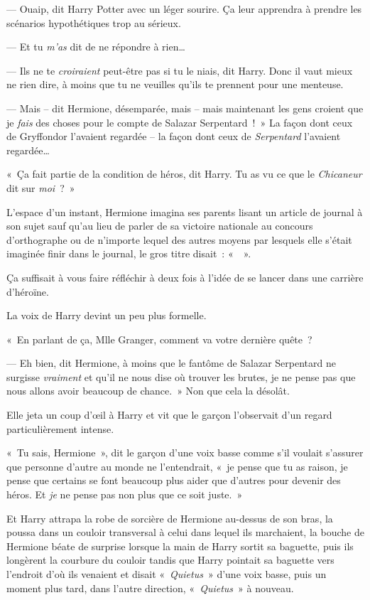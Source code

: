 --- Ouaip, dit Harry Potter avec un léger sourire.
Ça leur apprendra à prendre les scénarios hypothétiques trop au sérieux.

--- Et tu \emph{m'as} dit de ne répondre à rien…

--- Ils ne te \emph{croiraient} peut-être pas si tu le niais, dit Harry.
Donc il vaut mieux ne rien dire, à moins que tu ne veuilles qu'ils te prennent pour une menteuse.

--- Mais -- dit Hermione, désemparée, mais -- mais maintenant les gens croient que je \emph{fais} des choses pour le compte de Salazar Serpentard~!~»
La façon dont ceux de Gryffondor l'avaient regardée -- la façon dont ceux de \emph{Serpentard} l'avaient regardée…

«~Ça fait partie de la condition de héros, dit Harry.
Tu as vu ce que le \emph{Chicaneur} dit sur \emph{moi}~?~»

L'espace d'un instant, Hermione imagina ses parents lisant un article de journal à son sujet sauf qu'au lieu de parler de sa victoire nationale au concours d'orthographe ou de n'importe lequel des autres moyens par lesquels elle s'était imaginée finir dans le journal, le gros titre disait~: «~~».

Ça suffisait à vous faire réfléchir à deux fois à l'idée de se lancer dans une carrière d'héroïne.

La voix de Harry devint un peu plus formelle.

«~En parlant de ça, Mlle Granger, comment va votre dernière quête~?

--- Eh bien, dit Hermione, à moins que le fantôme de Salazar Serpentard ne surgisse \emph{vraiment} et qu'il ne nous dise où trouver les brutes, je ne pense pas que nous allons avoir beaucoup de chance.~»
Non que cela la désolât.

Elle jeta un coup d'œil à Harry et vit que le garçon l'observait d'un regard particulièrement intense.

«~Tu sais, Hermione~», dit le garçon d'une voix basse comme s'il voulait s'assurer que personne d'autre au monde ne l'entendrait, «~je pense que tu as raison, je pense que certains se font beaucoup plus aider que d'autres pour devenir des héros.
Et \emph{je} ne pense pas non plus que ce soit juste.~»

Et Harry attrapa la robe de sorcière de Hermione au-dessus de son bras, la poussa dans un couloir transversal à celui dans lequel ils marchaient, la bouche de Hermione béate de surprise lorsque la main de Harry sortit sa baguette, puis ils longèrent la courbure du couloir tandis que Harry pointait sa baguette vers l'endroit d'où ils venaient et disait «~\emph{Quietus}~» d'une voix basse, puis un moment plus tard, dans l'autre direction, «~\emph{Quietus}~» à nouveau.

